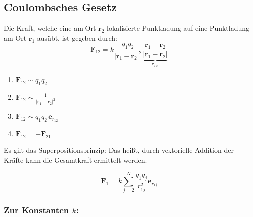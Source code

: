\documentclass[titlepage,11pt,a4paper,ngerman]{report}
\newcommand{\summ}[2]{\sum_{#1}^{#2}}
\renewcommand{\vec}[1]{\boldsymbol{#1}}
\renewcommand{\paragraph}[1]{\subsubsection{#1}}
\begin{document}
\subsection{Coulombsches Gesetz}

\begin{minipage}{.585\linewidth}
	Die Kraft, welche eine am Ort $\vec{r}_2$ lokalisierte Punktladung auf eine Punktladung am Ort $\vec{r}_1$ ausübt, ist gegeben durch:
	$$\vec{F}_{12} = k \frac{q_1 q_2}{|\vec{r}_1 - \vec{r}_2|^2} \underbrace{\frac{\vec{r}_1 - \vec{r}_2}{|\vec{r}_1 - \vec{r}_2|}}_{\vec{e}_{r_{12}}}$$
\end{minipage}
\begin{minipage}{.4\linewidth}
	\hspace{30pt}
\end{minipage}

\begin{enumerate}
	\item $\vec{F}_{12} \sim q_1 q_2$
	\item $\vec{F}_{12} \sim \frac{1}{|\vec{r}_1 - \vec{r}_2|^2}$
	\item $\vec{F}_{12} \sim q_1 q_2\, \vec{e}_{r_{12}}$
	\item $\vec{F}_{12} = -\vec{F}_{21}$
\end{enumerate}
Es gilt das Superpositionsprinzip: Das heißt, durch vektorielle Addition der Kräfte kann die Gesamtkraft ermittelt werden.

$$\vec{F}_1 = k \summ{j = 2}{N} \frac{q_1 q_j}{r_{1j}^2}\vec{e}_{r_{1j}}$$

\paragraph{Zur Konstanten $k$:}
\end{document}
